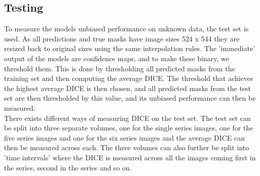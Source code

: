

\subsection{Testing}
To measure the models unbiased performance on unknown data, the test set is used. As all predictions and true masks have image sizes 524 x 544 they are resized back to original sizes using the same interpolation rules. The 'immediate' output of the models are confidence maps, and to make these binary, we threshold them. This is done by thresholding all predicted masks from the training set and then computing the average DICE. The threshold that achieves the highest average DICE is then chosen, and all predicted masks from the test set are then thresholded by this value, and its unbiased performance can then be measured.\\
There exists different ways of measuring DICE on the test set. The test set can be split into three separate volumes, one for the single series images, one for the five series images and one for the six series images and the average DICE can then be measured across each. The three volumes can also further be split into 'time intervals' where the DICE is measured across all the images coming first in the series, second in the series and so on.

